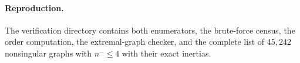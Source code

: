 \documentclass[11pt]{amsart}
\theoremstyle{definition}
\theoremstyle{remark}
\begin{document}
\paragraph{Reproduction.} The verification directory contains both enumerators, the brute-force census, the order computation, the extremal-graph checker, and the complete list of $45{,}242$ nonsingular graphs with $n^-\le4$ with their exact inertias.



\end{document}
